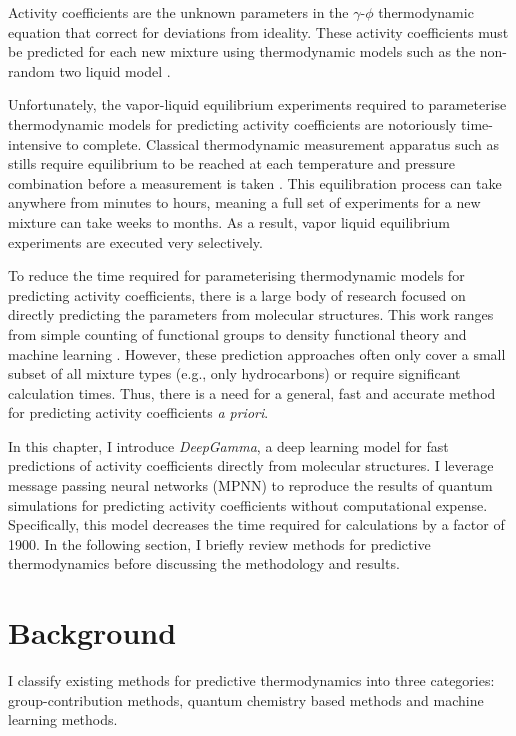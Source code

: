 Activity coefficients are the unknown parameters in the $\gamma$-$\phi$ thermodynamic equation that correct for deviations from ideality. These activity coefficients must be predicted for each new mixture using thermodynamic models such as the non-random two liquid model \cite{Renon1968}. 

Unfortunately, the vapor-liquid equilibrium experiments required to parameterise thermodynamic models for predicting activity coefficients are notoriously time-intensive to complete. Classical thermodynamic measurement apparatus such as stills require equilibrium to be reached at each temperature and pressure combination before a measurement is taken \cite{Ronc1976, Dechambre2014}. This equilibration process can take anywhere from minutes to hours, meaning a full set of experiments for a new mixture can take weeks to months. As a result, vapor liquid equilibrium experiments are executed very selectively.

To reduce the time required for parameterising thermodynamic models for predicting activity coefficients, there is a large body of research focused on directly predicting the parameters from molecular structures. This work ranges from simple counting of functional groups \cite{Fredenslund1975} to density functional theory \cite{ Klamt2010} and machine learning \cite{Urata2002, Nami2011,  Jirasek2020}.  However, these prediction approaches often only cover a small subset of all mixture types (e.g., only hydrocarbons) or require significant calculation times. Thus, there is a need for a general, fast and accurate method for predicting activity coefficients \textit{a priori}.

In this chapter, I introduce \textit{DeepGamma}, a deep learning model for fast predictions of activity coefficients directly from molecular structures.  I leverage message passing neural networks (MPNN) to reproduce the results of quantum simulations for predicting activity coefficients without computational expense. Specifically, this model decreases the time required for calculations by a factor of 1900. In the following section, I briefly review methods for predictive thermodynamics before discussing the methodology and results.

\section{Background}

I classify existing methods for predictive thermodynamics into three categories: group-contribution methods, quantum chemistry based methods and machine learning methods. 

